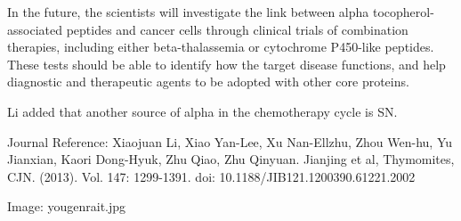 \documentclass{article}
\begin{document}
In the future, the scientists will investigate the link between alpha tocopherol-associated peptides and cancer cells through clinical trials of combination therapies, including either beta-thalassemia or cytochrome P450-like peptides. These tests should be able to identify how the target disease functions, and help diagnostic and therapeutic agents to be adopted with other core proteins.

Li added that another source of alpha in the chemotherapy cycle is SN.

Journal Reference: Xiaojuan Li, Xiao Yan-Lee, Xu Nan-Ellzhu, Zhou Wen-hu, Yu Jianxian, Kaori Dong-Hyuk, Zhu Qiao, Zhu Qinyuan. Jianjing et al, Thymomites, CJN. (2013). Vol. 147: 1299-1391. doi: 10.1188/JIB121.1200390.61221.2002

Image: yougenrait.jpg
\end{document}
